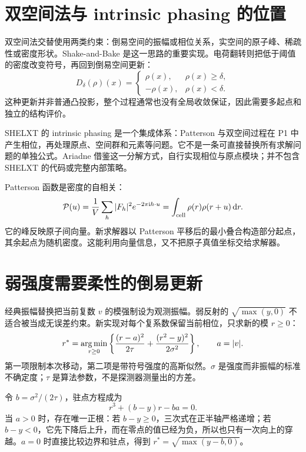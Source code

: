 \section{双空间法与 intrinsic phasing 的位置}
双空间法交替使用两类约束：倒易空间的振幅或相位关系，实空间的原子峰、稀疏性或密度形状。Shake-and-Bake 是这一思路的重要实现\cite{snb1994}。电荷翻转则把低于阈值的密度改变符号，再回到倒易空间更新\cite{charge2004,charge2008}：
\begin{equation}
 D_\delta(\rho)(x)=
 \begin{cases}\rho(x),&\rho(x)\ge\delta,\\-\rho(x),&\rho(x)<\delta.\end{cases}
\end{equation}
这种更新并非普通凸投影，整个过程通常也没有全局收敛保证，因此需要多起点和独立的结构评价。

SHELXT 的 intrinsic phasing 是一个集成体系：Patterson 与双空间过程在 P1 中产生相位，再处理原点、空间群和元素等问题\cite{shelxt2015}。它不是一条可直接替换所有求解问题的单独公式。Ariadne 借鉴这一分解方式，自行实现相位与原点模块；并不包含 SHELXT 的代码或完整内部策略。

Patterson 函数是密度的自相关：
\begin{equation}
 \mathcal P(u)=\frac1V\sum_h|F_h|^2e^{-2\pi\mathrm{i} h\cdot u}
 =\int_{\text{cell}}\rho(r)\rho(r+u)\,\mathrm{d} r.
\end{equation}
它的峰反映原子间向量。新求解器以 Patterson 平移后的最小叠合构造部分起点，其余起点为随机密度。这能利用向量信息，又不把原子真值坐标交给求解器。

\section{弱强度需要柔性的倒易更新}
经典振幅替换把当前复数 $v$ 的模强制设为观测振幅。弱反射的 $\sqrt{\max(y,0)}$ 不适合被当成无误差约束。新实现对每个复系数保留当前相位，只求新的模 $r\ge0$：
\begin{equation}\label{eq:prox}
 r^*=\operatorname*{arg\,min}_{r\ge0}
 \left\{\frac{(r-a)^2}{2\tau}+\frac{(r^2-y)^2}{2\sigma^2}\right\},
 \qquad a=|v|.
\end{equation}
第一项限制本次移动，第二项是带符号强度的高斯似然。$\sigma$ 是强度而非振幅的标准不确定度；$\tau$ 是算法参数，不是探测器测量出的方差。

令 $b=\sigma^2/(2\tau)$，驻点方程成为
\begin{equation}\label{eq:cubic}
 r^3+(b-y)r-ba=0.
\end{equation}
当 $a>0$ 时，存在唯一正根：若 $b-y\ge0$，三次式在正半轴严格递增；若 $b-y<0$，它先下降后上升，而在零点的值已经为负，所以也只有一次向上的穿越。$a=0$ 时直接比较边界和驻点，得到 $r^*=\sqrt{\max(y-b,0)}$。

